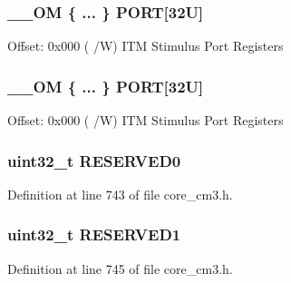 \subsubsection[{\texorpdfstring{P\+O\+RT}{PORT}}]{\setlength{\rightskip}{0pt plus 5cm}\+\_\+\+\_\+\+OM \{ ... \}    P\+O\+RT\mbox{[}32\+U\mbox{]}}\hypertarget{struct_i_t_m___type_aff9add4806ce61d03f079a7f5e07ccf6}{}\label{struct_i_t_m___type_aff9add4806ce61d03f079a7f5e07ccf6}
Offset\+: 0x000 ( /W) I\+TM Stimulus Port Registers 
\subsubsection[{\texorpdfstring{P\+O\+RT}{PORT}}]{\setlength{\rightskip}{0pt plus 5cm}\+\_\+\+\_\+\+OM \{ ... \}    P\+O\+RT\mbox{[}32\+U\mbox{]}}\hypertarget{struct_i_t_m___type_a1e83289e7a6de858bcdc3e124b457732}{}\label{struct_i_t_m___type_a1e83289e7a6de858bcdc3e124b457732}
Offset\+: 0x000 ( /W) I\+TM Stimulus Port Registers 
\subsubsection[{\texorpdfstring{R\+E\+S\+E\+R\+V\+E\+D0}{RESERVED0}}]{\setlength{\rightskip}{0pt plus 5cm}uint32\+\_\+t R\+E\+S\+E\+R\+V\+E\+D0}\hypertarget{struct_i_t_m___type_abbf2da13b6377b5a759cca640bd0e552}{}\label{struct_i_t_m___type_abbf2da13b6377b5a759cca640bd0e552}


Definition at line 743 of file core\+\_\+cm3.\+h.

\subsubsection[{\texorpdfstring{R\+E\+S\+E\+R\+V\+E\+D1}{RESERVED1}}]{\setlength{\rightskip}{0pt plus 5cm}uint32\+\_\+t R\+E\+S\+E\+R\+V\+E\+D1}\hypertarget{struct_i_t_m___type_a8800cb3dfa65c86b1808c4bd27f99900}{}\label{struct_i_t_m___type_a8800cb3dfa65c86b1808c4bd27f99900}


Definition at line 745 of file core\+\_\+cm3.\+h.

